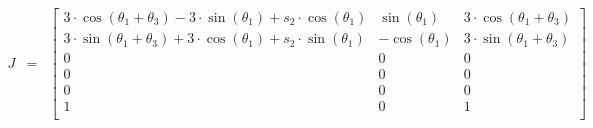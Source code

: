\begin{eqnarray}J&=&\begin{bmatrix}
3\cdot \cos(\theta_1 + \theta_3) - 3\cdot \sin(\theta_1) + s_2\cdot \cos(\theta_1)&\sin(\theta_1)&3\cdot \cos(\theta_1 + \theta_3)\\ 
3\cdot \sin(\theta_1 + \theta_3) + 3\cdot \cos(\theta_1) + s_2\cdot \sin(\theta_1)&-\cos(\theta_1)&3\cdot \sin(\theta_1 + \theta_3)\\ 
0&0&0\\ 
0&0&0\\ 
0&0&0\\ 
1&0&1\\ 
\end{bmatrix}\end{eqnarray}